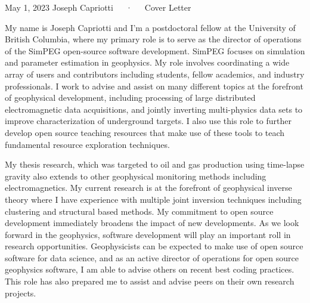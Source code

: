 \documentclass[11pt, a4paper]{awesome-cv}
\begin{document}
\makecvheader[R]

\makecvfooter
  {May 1, 2023}
  {Joseph Capriotti~~~·~~~Cover Letter}
  {}

\makelettertitle

\begin{cvletter}

My name is Joseph Capriotti and I'm a postdoctoral fellow at the University of British Columbia, where my primary role is to serve as the director of operations of the SimPEG open-source software development. SimPEG focuses on simulation and parameter estimation in geophysics. My role involves coordinating a wide array of users and contributors including students, fellow academics, and industry professionals. I work to advise and assist on many different topics at the forefront of geophysical development, including processing of large distributed electromagnetic data acquisitions, and jointly inverting multi-physics data sets to improve characterization of underground targets. I also use this role to further develop open source teaching resources that make use of these tools to teach fundamental resource exploration techniques.

My thesis research, which was targeted to oil and gas production using time-lapse gravity also extends to other geophysical monitoring methods including electromagnetics. My current research is at the forefront of geophysical inverse theory where I have experience with multiple joint inversion techniques including clustering and structural based methods. My commitment to open source development immediately broadens the impact of new developments. As we look forward in the geophysics, software development will play an important roll in research opportunities. Geophysicists can be expected to make use of open source software for data science, and as an active director of operations for open source geophysics software, I am able to advise others on recent best coding practices. This role has also prepared me to assist and advise peers on their own research projects.


\end{cvletter}
\end{document}
